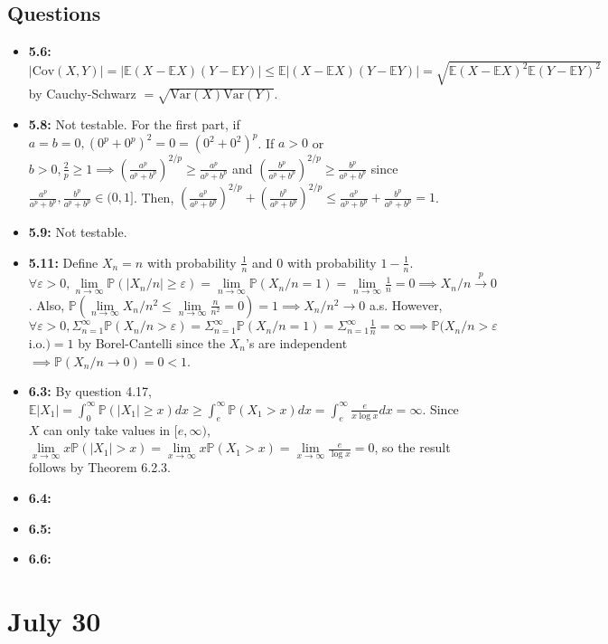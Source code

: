 \documentclass[12pt]{article}
\newcommand{\E}{\mathbb{E}}
\newcommand{\p}{\mathbb{P}}
\newcommand{\V}{\text{Var}}
\begin{document}
\subsection*{Questions}
\begin{itemize}
    \item \textbf{5.6:} $|\text{Cov}(X,Y)| = |\E(X - \E X)(Y - \E Y)| \leq \E|(X - \E X)(Y - \E Y)| = \sqrt{\E(X - \E X)^2 \E(Y - \E Y)^2}$ by Cauchy-Schwarz $= \sqrt{\V(X)\V(Y)}$.
    \item \textbf{5.8:} Not testable. For the first part, if $a = b = 0, (0^p + 0^p)^2 = 0 = (0^2 + 0^2)^p$. If $a > 0$ or $b > 0, \frac{2}{p} \geq 1 \implies (\frac{a^p}{a^p + b^p})^{2/p} \geq \frac{a^p}{a^p + b^p}$ and $(\frac{b^p}{a^p + b^p})^{2/p} \geq \frac{b^p}{a^p + b^p}$ since $ \frac{a^p}{a^p + b^p}, \frac{b^p}{a^p + b^p} \in (0,1]$. Then, $(\frac{a^p}{a^p + b^p})^{2/p} + (\frac{b^p}{a^p + b^p})^{2/p} \leq \frac{a^p}{a^p + b^p} + \frac{b^p}{a^p + b^p} = 1$.
    \item \textbf{5.9:} Not testable.
    \item \textbf{5.11:} Define $X_n = n$ with probability $\frac{1}{n}$ and 0 with probability $1-\frac{1}{n}$. $\forall \varepsilon > 0, \lim \limits_{n\to\infty} \p(|X_n/n| \geq \varepsilon) = \lim \limits_{n\to\infty} \p(X_n/n = 1) = \lim \limits_{n\to\infty} \frac{1}{n} = 0 \implies X_n/n \overset{p}{\to} 0$. Also, $\p(\lim \limits_{n\to\infty} X_n/n^2 \leq \lim \limits_{n\to\infty} \frac{n}{n^2} = 0) = 1 \implies X_n/n^2 \to 0$ a.s. However, $\forall \varepsilon > 0, \Sigma_{n=1}^\infty \p(X_n/n > \varepsilon) = \Sigma_{n=1}^\infty \p(X_n/n = 1) = \Sigma_{n=1}^\infty \frac{1}{n} = \infty \implies \p(X_n/n > \varepsilon$ i.o.$) = 1$ by Borel-Cantelli since the $X_n$'s are independent $ \implies \p(X_n/n \to 0) = 0 < 1$.
    \item \textbf{6.3:} By question 4.17, $\E|X_1| = \int_0^\infty \p(|X_1| \geq x)dx \geq \int_e^\infty \p(X_1 > x)dx = \int_e^\infty \frac{e}{x\log x}dx = \infty$. Since $X$ can only take values in $[e,\infty)$, $\lim \limits_{x\to\infty} x\p(|X_1| > x) = \lim \limits_{x\to\infty} x\p(X_1 > x) = \lim \limits_{x\to\infty} \frac{e}{\log x} = 0$, so the result follows by Theorem 6.2.3.
    \item \textbf{6.4:}
    \item \textbf{6.5:}
    \item \textbf{6.6:}
\end{itemize}

\section*{July 30}
\end{document}
